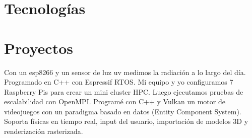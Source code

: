 \documentclass[10pt, a4paper]{moderncv}
\begin{document}
\section{Tecnologías}

\section{Proyectos}
{
	Con un esp8266 y un sensor de luz uv medimos la radiación a lo largo del día. Programado en C++ con Espressif RTOS.
}
{
	Mi equipo y yo configuramos 7 Raspberry Pis para crear un mini cluster HPC.
	Luego ejecutamos pruebas de escalabilidad con OpenMPI.
}
{
	Programé con C++ y Vulkan un motor de videojuegos con un paradigma basado en datos (Entity Component System).
	Soporta físicas en tiempo real, input del usuario, importación de modelos 3D y renderización rasterizada.
}


\end{document}
